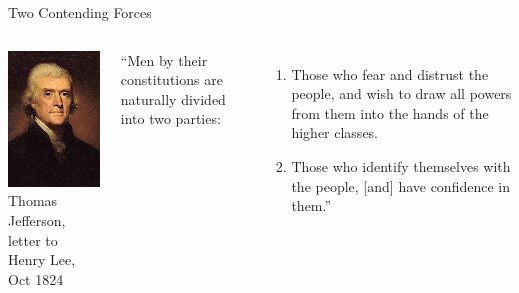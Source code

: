 \begin{frame}{Two Contending Forces}
    \begin{columns}[onlytextwidth]
            \centering
            \includegraphics[height=0.75\textheight]{img/jefferson.png} \\
            Thomas Jefferson, letter to Henry Lee, Oct 1824

            ``Men by their constitutions are naturally divided into two parties: \\
            \begin{enumerate}
                \item Those who fear and distrust the people, and wish to draw all powers from them into the hands of the higher classes.
                \item Those who identify themselves with the people, [and] have confidence in them.''
            \end{enumerate}
    \end{columns}
\end{frame}

